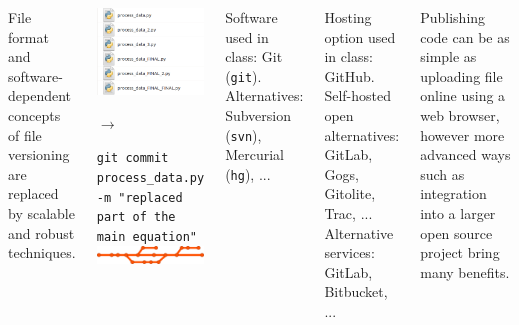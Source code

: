 \documentclass[25pt, margin=0mm, innermargin=25mm, blockverticalspace=25mm, colspace=25mm, subcolspace=8mm]{tikzposter}
\newcommand{\blocktitlewrap}[1]{\textsf{\textbf{\Huge#1}}}
\begin{document}
\begin{columns}
{\LARGE

File format and software-dependent concepts of file versioning are
replaced by scalable and robust techniques.

\vspace*{0.7cm}

\begin{center}
\includegraphics[width=0.25\linewidth]{file_versions}
\begin{minipage}{0.05\linewidth}
{\Huge $\rightarrow$}
{
\normalsize
\rule{0pt}{12ex}
}
\end{minipage}
\begin{minipage}[b]{0.45\linewidth}
\centering
{
\normalsize
\texttt{git commit process\_data.py -m "replaced part of the main equation"}\\
}
\vspace*{1ex}
\includegraphics[width=\linewidth]{revisions}
\end{minipage}
\end{center}

\normalsize

\vspace*{-4ex}

Software used in class: Git (\texttt{git}).
Alternatives: Subversion (\texttt{svn}), Mercurial (\texttt{hg}), ...

Hosting option used in class: GitHub.
Self-hosted open alternatives: GitLab, Gogs, Gitolite, Trac, ...
Alternative services: GitLab, Bitbucket, ...



\LARGE

Publishing code can be as simple as uploading file online using a web browser,
however more advanced ways such as integration into a larger open source project
bring many benefits.

}
\end{columns}
\end{document}
